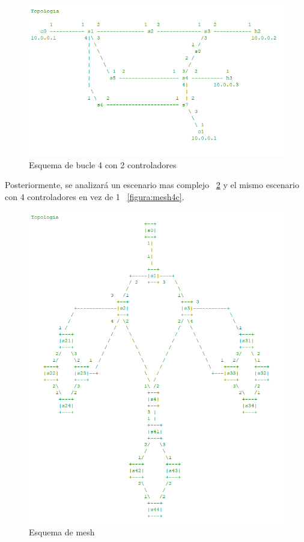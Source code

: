 \documentclass[a4paper, 12pt]{book}
\begin{document}
	\begin{figure}
		\centering
		\includegraphics[width=16cm, keepaspectratio]{img/2controllers}
		\caption{Esquema de bucle 4 con 2 controladores}
		\label{figura:2controllers}
	\end{figure}
	
	Posteriormente, se analizará un escenario mas complejo ~\ref{figura:mesh} y el mismo escenario con 4 controladores en vez de 1 ~\ref{figura:mesh4c}.
	
	\begin{figure}
		\centering
		\includegraphics[width=16cm, keepaspectratio]{img/mesh}
		\caption{Esquema de mesh}
		\label{figura:mesh}
	\end{figure}
	
\end{document}
